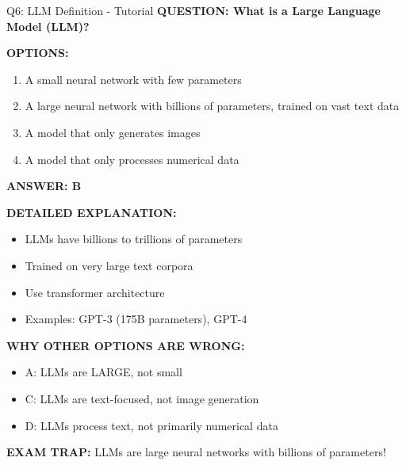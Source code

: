 \documentclass[8pt]{beamer}
\begin{document}
	\begin{frame}{Q6: LLM Definition - Tutorial}
		\fontsize{6.5}{7.5}\selectfont
		\textbf{QUESTION: What is a Large Language Model (LLM)?}
		
		\vspace{0.1cm}
		\textbf{OPTIONS:}
		\begin{enumerate}
			\item A small neural network with few parameters
			\item A large neural network with billions of parameters, trained on vast text data
			\item A model that only generates images
			\item A model that only processes numerical data
		\end{enumerate}
		
		\vspace{0.1cm}
		\textcolor{myblue}{\textbf{ANSWER: B}}
		
		\vspace{0.1cm}
		\textbf{DETAILED EXPLANATION:}
		\begin{itemize}
			\item LLMs have billions to trillions of parameters
			\item Trained on very large text corpora
			\item Use transformer architecture
			\item Examples: GPT-3 (175B parameters), GPT-4
		\end{itemize}
		
		\vspace{0.1cm}
		\textcolor{myred}{\textbf{WHY OTHER OPTIONS ARE WRONG:}}
		\begin{itemize}
			\item \textcolor{myred}{A:} LLMs are LARGE, not small
			\item \textcolor{myred}{C:} LLMs are text-focused, not image generation
			\item \textcolor{myred}{D:} LLMs process text, not primarily numerical data
		\end{itemize}
		
		\textcolor{myred}{\textbf{EXAM TRAP:}} LLMs are \textcolor{myblue}{large neural networks} with billions of parameters!
	\end{frame}
	
\end{document}
